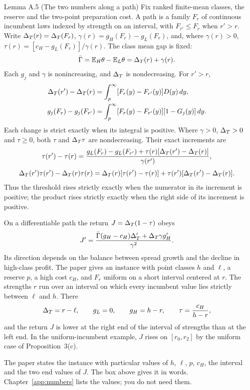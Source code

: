 \begin{paperresult}{Lemma A.5 (The two numbers along a path)}
Fix ranked finite-mean classes, the reserve and the two-point preparation cost. A path is a family \(F_r\) of
continuous incumbent laws indexed by strength on an interval, with \(F_{r'}\le F_r\) when \(r'>r\). Write
\(\Delta_T(r)=\Delta_T(F_r)\), \(\gamma(r)=g_H(F_r)-g_L(F_r)\), and, where \(\gamma(r)>0\),
\(\tau(r)=[c_H-g_L(F_r)]/\gamma(r)\). The class mean gap is fixed:
\[
\bar\Gamma=\mathbb{E}_H\theta-\mathbb{E}_L\theta=\Delta_T(r)+\gamma(r).
\]
Each \(g_j\) and \(\gamma\) is nonincreasing, and \(\Delta_T\) is nondecreasing. For \(r'>r\),
\[
\begin{aligned}
\Delta_T(r')-\Delta_T(r)&=\int_p^\infty[F_r(y)-F_{r'}(y)]D(y)\,dy,\\
g_j(F_r)-g_j(F_{r'})&=\int_p^\infty[F_r(y)-F_{r'}(y)][1-G_j(y)]\,dy.
\end{aligned}
\]
Each change is strict exactly when its integral is positive. Where \(\gamma>0\), \(\Delta_T>0\) and \(\tau\ge0\), both
\(\tau\) and \(\Delta_T\tau\) are nondecreasing. Their exact increments are
\[
\tau(r')-\tau(r)=\frac{g_L(F_r)-g_L(F_{r'})+\tau(r)[\Delta_T(r')-\Delta_T(r)]}{\gamma(r')},
\]
\[
\Delta_T(r')\tau(r')-\Delta_T(r)\tau(r)=\Delta_T(r)[\tau(r')-\tau(r)]+\tau(r')[\Delta_T(r')-\Delta_T(r)].
\]
Thus the threshold rises strictly exactly when the numerator in its increment is positive; the product rises
strictly exactly when the right side of its increment is positive.

On a differentiable path the return \(J=\Delta_T(1-\tau)\) obeys
\[
J'=\frac{\bar\Gamma(g_H-c_H)\Delta_T'+\Delta_T\gamma g_H'}{\gamma^2}.
\]
Its direction depends on the balance between spread growth and the decline in high-class profit. The paper gives an
instance with point classes \(h\) and \(\ell\), a reserve \(p\), a high cost \(c_H\), and \(F_r\) uniform on a short
interval centered at \(r\). The strengths \(r\) run over an interval on which every incumbent value lies strictly
between \(\ell\) and \(h\). There
\[
\Delta_T=r-\ell,\qquad g_L=0,\qquad g_H=h-r,\qquad \tau=\frac{c_H}{h-r},
\]
and the return \(J\) is lower at the right end of the interval of strengths than at the left end. In the
uniform-incumbent example, \(J\) rises on \([r_0,r_2]\) by the uniform case of Proposition~3(c).
\end{paperresult}

The paper states the instance with particular values of \(h\), \(\ell\), \(p\), \(c_H\), the interval and the two end
values of \(J\). The box above gives it in words. Chapter~\ref{app:numbers} lists the values; you do not need them.

